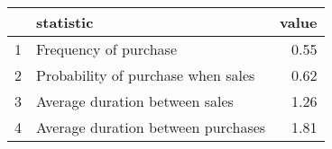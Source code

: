 \begin{tabular}{rlr}
  \hline
 & statistic & value \\ 
  \hline
1 & Frequency of purchase & 0.55 \\ 
  2 & Probability of purchase when sales & 0.62 \\ 
  3 & Average duration between sales & 1.26 \\ 
  4 & Average duration between purchases & 1.81 \\ 
   \hline
\end{tabular}
